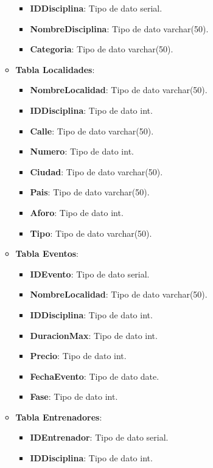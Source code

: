 \begin{enumerate}
\begin{itemize}
\begin{itemize}
            \item \textbf{IDDisciplina}: Tipo de dato serial.
            \item \textbf{NombreDisciplina}: Tipo de dato varchar(50).
            \item \textbf{Categoria}: Tipo de dato varchar(50).
        \end{itemize}
        \item \textbf{Tabla Localidades}:
        \begin{itemize}
            \item \textbf{NombreLocalidad}: Tipo de dato varchar(50).
            \item \textbf{IDDisciplina}: Tipo de dato int.
            \item \textbf{Calle}: Tipo de dato varchar(50).
            \item \textbf{Numero}: Tipo de dato int.
            \item \textbf{Ciudad}: Tipo de dato varchar(50).
            \item \textbf{Pais}: Tipo de dato varchar(50).
            \item \textbf{Aforo}: Tipo de dato int.
            \item \textbf{Tipo}: Tipo de dato varchar(50).
        \end{itemize}
        \item \textbf{Tabla Eventos}:
        \begin{itemize}
            \item \textbf{IDEvento}: Tipo de dato serial.
            \item \textbf{NombreLocalidad}: Tipo de dato varchar(50).
            \item \textbf{IDDisciplina}: Tipo de dato int.
            \item \textbf{DuracionMax}: Tipo de dato int.
            \item \textbf{Precio}: Tipo de dato int.
            \item \textbf{FechaEvento}: Tipo de dato date.
            \item \textbf{Fase}: Tipo de dato int.
        \end{itemize}
        \item \textbf{Tabla Entrenadores}:
        \begin{itemize}
            \item \textbf{IDEntrenador}: Tipo de dato serial.
            \item \textbf{IDDisciplina}: Tipo de dato int.

\end{itemize}
\end{itemize}
\end{enumerate}
